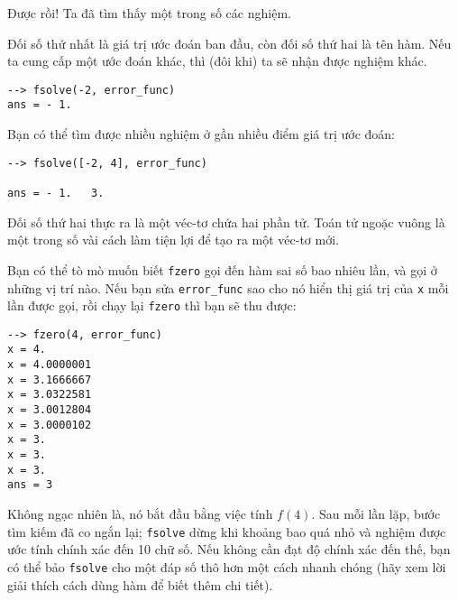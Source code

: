 \documentclass[12pt]{book}
\begin{document}
Được rồi! Ta đã tìm thấy một trong số các nghiệm.

Đối số thứ nhất là giá trị ước đoán ban đầu, còn đối số 
thứ hai là tên hàm. Nếu ta cung cấp 
một ước đoán khác, thì (đôi khi) ta sẽ nhận được nghiệm khác.

\begin{verbatim}
--> fsolve(-2, error_func)
ans = - 1.
\end{verbatim}

Bạn có thể tìm được nhiều nghiệm ở gần nhiều điểm giá trị
ước đoán:

\begin{verbatim}
--> fsolve([-2, 4], error_func)

ans = - 1.   3.
\end{verbatim}

Đối số thứ hai thực ra là một véc-tơ chứa hai phần tử. Toán tử
ngoặc vuông là một trong số vài cách làm tiện lợi để tạo ra 
một véc-tơ mới.

Bạn có thể tò mò muốn biết {\tt fzero} gọi đến hàm sai số bao nhiêu
lần, và gọi ở những vị trí nào. Nếu bạn sửa \verb#error_func# 
sao cho nó hiển thị giá trị của {\tt x} mỗi lần được gọi, rồi chạy lại 
{\tt fzero} thì bạn sẽ thu được:

\begin{verbatim}
--> fzero(4, error_func)
x = 4.
x = 4.0000001
x = 3.1666667
x = 3.0322581
x = 3.0012804
x = 3.0000102
x = 3.
x = 3.
x = 3.
ans = 3
\end{verbatim}

Không ngạc nhiên là, nó bắt đầu bằng việc tính $f(4)$. 
Sau mỗi lần lặp, bước tìm kiếm đã co ngắn lại; {\tt fsolve} 
dừng khi khoảng bao quá nhỏ và nghiệm được ước tính chính xác
đến 10 chữ số. Nếu không cần đạt độ chính xác đến thế, bạn
có thể bảo {\tt fsolve} cho một đáp số thô hơn một cách nhanh
chóng (hãy xem lời giải thích cách dùng hàm để biết thêm chi tiết).
\end{document}
